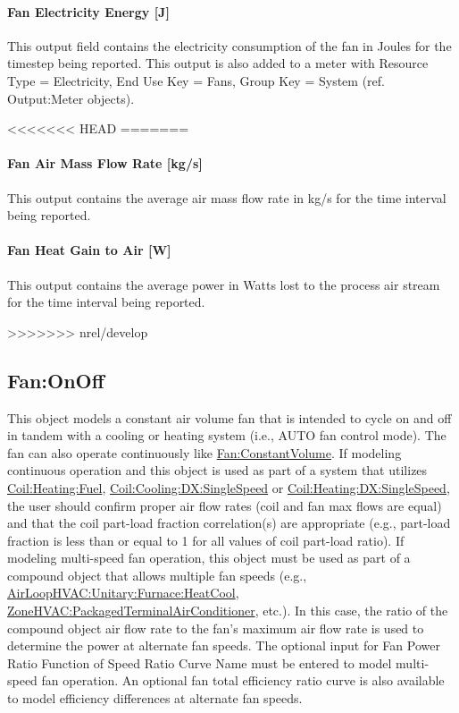 \paragraph{Fan Electricity Energy {[}J{]}}\label{fan-electric-energy-j}

This output field contains the electricity consumption of the fan in Joules for the timestep being reported. This output is also added to a meter with Resource Type = Electricity, End Use Key = Fans, Group Key = System (ref. Output:Meter objects).

<<<<<<< HEAD
=======
\paragraph{Fan Air Mass Flow Rate {[}kg/s{]}}\label{fan-air-mass-flow-kgs}

This output contains the average air mass flow rate in kg/s for the time interval being reported.

\paragraph{Fan Heat Gain to Air {[}W{]}}\label{fan-heat-gain-to-air-w}

This output contains the average power in Watts lost to the process air stream for the time interval being reported.

>>>>>>> nrel/develop
\subsection{Fan:OnOff}\label{fanonoff}

This object models a constant air volume fan that is intended to cycle on and off in tandem with a cooling or heating system (i.e., AUTO fan control mode). The fan can also operate continuously like \hyperref[fanconstantvolume]{Fan:ConstantVolume}. If modeling continuous operation and this object is used as part of a system that utilizes \hyperref[coilheatinggas-000]{Coil:Heating:Fuel}, \hyperref[coilcoolingdxsinglespeed]{Coil:Cooling:DX:SingleSpeed} or \hyperref[coilheatingdxsinglespeed]{Coil:Heating:DX:SingleSpeed}, the user should confirm proper air flow rates (coil and fan max flows are equal) and that the coil part-load fraction correlation(s) are appropriate (e.g., part-load fraction is less than or equal to 1 for all values of coil part-load ratio). If modeling multi-speed fan operation, this object must be used as part of a compound object that allows multiple fan speeds (e.g., \hyperref[airloophvacunitaryfurnaceheatcool]{AirLoopHVAC:Unitary:Furnace:HeatCool}, \hyperref[zonehvacpackagedterminalairconditioner]{ZoneHVAC:PackagedTerminalAirConditioner}, etc.). In this case, the ratio of the compound object air flow rate to the fan's maximum air flow rate is used to determine the power at alternate fan speeds. The optional input for Fan Power Ratio Function of Speed Ratio Curve Name must be entered to model multi-speed fan operation. An optional fan total efficiency ratio curve is also available to model efficiency differences at alternate fan speeds.

